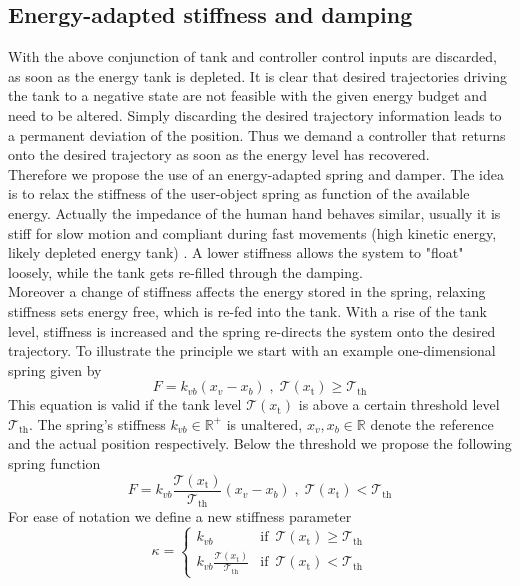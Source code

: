 \documentclass[a4paper,twoside, openright,12pt]{report}
\newcommand{\g}[1]{\text{#1}}
\begin{document}
\subsection{Energy-adapted stiffness and damping}\label{SS:EnergyAdaptedStiffness}
With the above conjunction of tank and controller control inputs are discarded, as soon as the energy tank is depleted. It is clear that desired trajectories driving the tank to a negative state are not feasible with the given energy budget and need to be altered. Simply discarding the desired trajectory information leads to a permanent deviation of the position. Thus we demand a controller that returns onto the desired trajectory as soon as the energy level has recovered.\\ Therefore we propose the use of an energy-adapted spring and damper. The idea is to relax the stiffness of the user-object spring as function of the available energy. Actually the impedance of the human hand behaves similar, usually it is stiff for slow motion and compliant during fast movements (high kinetic energy, likely depleted energy tank) \cite{Hogan_84b}. A lower stiffness allows the system to "float" loosely, while the tank gets re-filled through the damping.\\ Moreover a change of stiffness affects the energy stored in the spring, relaxing stiffness sets energy free, which is re-fed into the tank. With a rise of the tank level, stiffness is increased and the spring re-directs the system onto the desired trajectory. To illustrate the principle we start with an example one-dimensional spring given by
\begin{equation}
F = k_{vb}(x_v-x_b) \;,\; \mathcal{T}(x_\g{t})\geq \mathcal{T}_{\g{th}}
\end{equation}
This equation is valid if the tank level $\mathcal{T}(x_\g{t})$ is above a certain threshold level $\mathcal{T}_{\g{th}}$. The spring's stiffness $k_{vb} \in \mathbb{R}^+$ is unaltered, $x_v, x_b \in \mathbb{R}$ denote the reference and the actual position respectively. Below the threshold we propose the following spring function
\begin{equation}
F = k_{vb}\frac{\mathcal{T}(x_\g{t})}{\mathcal{T}_{\g{th}}}(x_v-x_b) \;,\; \mathcal{T}(x_\g{t})<\mathcal{T}_{\g{th}}
\end{equation}
For ease of notation we define a new stiffness parameter
\begin{equation}
\kappa = \begin{cases}
k_{vb} & \text{if } \, \mathcal{T}(x_\g{t})\geq \mathcal{T}_{\g{th}} \\
k_{vb} \frac{\mathcal{T}(x_\g{t})}{\mathcal{T}_{\g{th}}} & \text{if } \, \mathcal{T}(x_\g{t}) < \mathcal{T}_{\g{th}}
\end{cases}
\end{equation}
\end{document}
